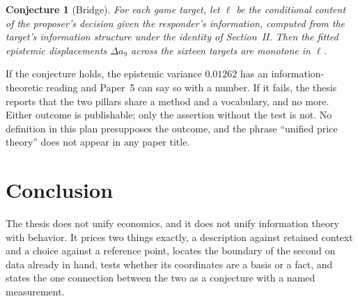 \documentclass[11pt,onecolumn]{IEEEtran}
\newtheorem{conjecture}[theorem]{Conjecture}
\begin{document}
\begin{conjecture}[Bridge]
For each game target, let $\ell$ be the conditional content of the proposer's decision given the responder's information, computed from the target's information structure under the identity of Section~II.
Then the fitted epistemic displacements $\Delta a_9$ across the sixteen targets are monotone in $\ell$.
\end{conjecture}

If the conjecture holds, the epistemic variance $0.01262$ has an information-theoretic reading and Paper~5 can say so with a number.
If it fails, the thesis reports that the two pillars share a method and a vocabulary, and no more.
Either outcome is publishable; only the assertion without the test is not.
No definition in this plan presupposes the outcome, and the phrase ``unified price theory'' does not appear in any paper title.

\section{Conclusion}

The thesis does not unify economics, and it does not unify information theory with behavior.
It prices two things exactly, a description against retained context and a choice against a reference point, locates the boundary of the second on data already in hand, tests whether its coordinates are a basis or a fact, and states the one connection between the two as a conjecture with a named measurement.
\end{document}
